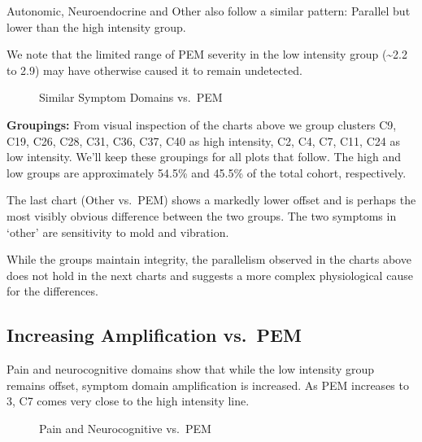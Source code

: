 \documentclass[
  letterpaper,
  DIV=11,
  numbers=noendperiod]{scrartcl}
\begin{document}
Autonomic, Neuroendocrine and Other also follow a similar pattern:
Parallel but lower than the high intensity group.

We note that the limited range of PEM severity in the low intensity
group (\textasciitilde2.2 to 2.9) may have otherwise caused it to remain
undetected.

\begin{figure}[h]


\caption{\label{fig-symptoms}Similar Symptom Domains vs.~PEM}

\end{figure}%

\FloatBarrier

\textbf{Groupings:} From visual inspection of the charts above we group
clusters C9, C19, C26, C28, C31, C36, C37, C40 as high intensity, C2,
C4, C7, C11, C24 as low intensity. We'll keep these groupings for all
plots that follow. The high and low groups are approximately 54.5\% and
45.5\% of the total cohort, respectively.

The last chart (Other vs.~PEM) shows a markedly lower offset and is
perhaps the most visibly obvious difference between the two groups. The
two symptoms in `other' are sensitivity to mold and vibration.

\FloatBarrier

While the groups maintain integrity, the parallelism observed in the
charts above does not hold in the next charts and suggests a more
complex physiological cause for the differences.

\subsection{Increasing Amplification
vs.~PEM}\label{increasing-amplification-vs.-pem}

Pain and neurocognitive domains show that while the low intensity group
remains offset, symptom domain amplification is increased. As PEM
increases to 3, C7 comes very close to the high intensity line.

\begin{figure}[h]


\caption{\label{fig-pain}Pain and Neurocognitive vs.~PEM}

\end{figure}%
\end{document}
